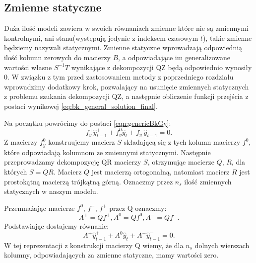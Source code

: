 \subsection{Zmienne statyczne}

Duża ilość modeli zawiera w swoich równaniach zmienne które nie są zmiennymi kontrolnymi, ani stanu(występują jedynie z indeksem czasowym $t$), takie zmienne będziemy nazywali statycznymi. Zmienne statyczne wprowadzają odpowiednią ilość kolumn zerowych do macierzy $B$, a odpowiadające im generalizowane wartości własne $S^{-1}T$ wynikające z dekompozycji QZ będą odpowiednio wynosiły 0. W związku z tym przed zastosowaniem metody z poprzedniego rozdziału wprowadzimy dodatkowy krok, pozwalający na usunięcie zmiennych statycznych z problemu szukania dekompozycji QZ, a następnie obliczenie funkcji przejścia z postaci wynikowej \eqref{eq:bk_general_solution_final}.

Na początku powrócimy do postaci \eqref{eqn:genericBkGy}:
\begin{equation}
    f_y^+ \hat{y}^+_{t-1} + f_y^0 \hat{y}_t + f_y^- \hat{y}^-_{t-1} = 0.
\end{equation}
Z macierzy $f_y^0$ konstruujemy macierz $S$ składającą się z tych kolumn macierzy $f^0$, które odpowiadają kolumnom ze zmiennymi statycznymi. Następnie przeprowadzamy dekompozycję QR macierzy $S$, otrzymując macierze $Q$, $R$, dla których $S = QR$. Macierz $Q$ jest macierzą ortogonalną, natomiast macierz $R$ jest prostokątną macierzą trójkątną górną. Oznaczmy przez $n_s$ ilość zmiennych statycznych w naszym modelu.

Przemnażając macierze $f^0$, $f^-$, $f^+$ przez Q oznaczmy:
\begin{equation}
    A^+ = Q f^+, A^0 = Q f^0, A^- = Q f^-.
\end{equation}
Podstawiając dostajemy równanie:
\begin{equation}
\label{eqn:staticQMult}
    A^+ \hat{y}^+_{t-1} + A^0 \hat{y}_t + A^- \hat{y}^-_{t-1} = 0.
\end{equation}
W tej reprezentacji z konstrukcji macierzy Q wiemy, że dla $n_s$ dolnych wierszach kolumny, odpowiadających za zmienne statyczne, mamy wartości zero. 

